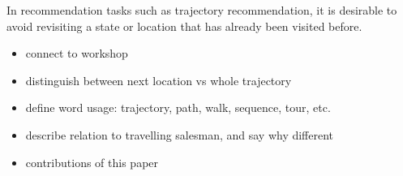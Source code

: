 
In recommendation tasks such as trajectory recommendation, it is desirable to avoid revisiting
a state or location that has already been visited before.

\begin{itemize}
	\item connect to workshop
	\item distinguish between next location vs whole trajectory
	\item define word usage: trajectory, path, walk, sequence, tour, etc.
	\item describe relation to travelling salesman, and say why different
	\item contributions of this paper
\end{itemize}
